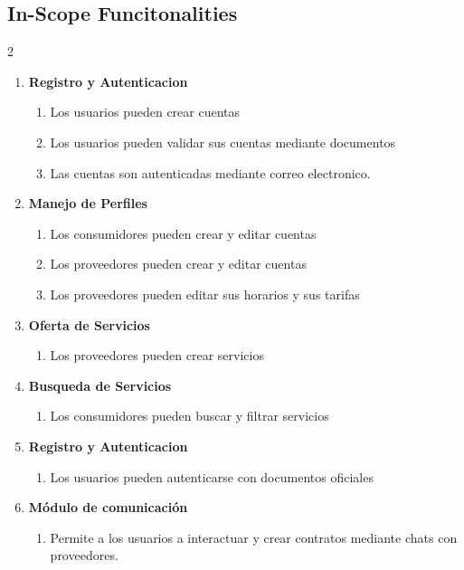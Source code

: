 \documentclass{article}
\begin{document}
  \subsection{In-Scope Funcitonalities}
  \begin {multicols}{2}
    \begin{enumerate}
      \item \textbf{Registro y Autenticacion}
        \begin{enumerate}
          \item Los usuarios pueden crear cuentas
          \item Los usuarios pueden validar sus cuentas mediante documentos
          \item Las cuentas son autenticadas mediante correo electronico.
        \end{enumerate}
      \item \textbf{Manejo de Perfiles}
        \begin{enumerate}
          \item Los consumidores pueden crear y editar cuentas
          \item Los proveedores pueden crear  y editar cuentas
          \item Los proveedores pueden editar sus horarios y sus tarifas
        \end{enumerate}
      \item \textbf{Oferta de Servicios}
        \begin{enumerate}
          \item Los proveedores pueden crear servicios
        \end{enumerate}
      \item \textbf{Busqueda de Servicios}
        \begin{enumerate}
          \item Los consumidores pueden buscar y filtrar servicios
        \end{enumerate}
      \item \textbf{Registro y Autenticacion}
        \begin{enumerate}
          \item Los usuarios pueden autenticarse con documentos oficiales
        \end{enumerate}
      \item \textbf{Módulo de comunicación } 
        \begin{enumerate}
          \item Permite a los usuarios a interactuar y crear contratos mediante chats con proveedores. 

\end{enumerate}
\end{enumerate}
\end{multicols}
\end{document}
